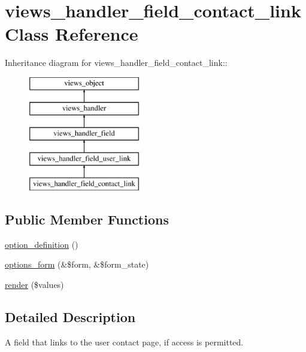 \hypertarget{classviews__handler__field__contact__link}{
\section{views\_\-handler\_\-field\_\-contact\_\-link Class Reference}
\label{classviews__handler__field__contact__link}
}
Inheritance diagram for views\_\-handler\_\-field\_\-contact\_\-link::\begin{figure}[H]
\begin{center}
\leavevmode
\includegraphics[height=5cm]{classviews__handler__field__contact__link}
\end{center}
\end{figure}
\subsection*{Public Member Functions}
\begin{CompactItemize}
\item 
\hyperlink{classviews__handler__field__contact__link_33c1b1091d417e0e5a1b82bfdc81b83b}{option\_\-definition} ()
\item 
\hyperlink{classviews__handler__field__contact__link_d6709f7a6f48dc51fe3952f26598e622}{options\_\-form} (\&\$form, \&\$form\_\-state)
\item 
\hyperlink{classviews__handler__field__contact__link_08fa45e6542168dfe0dcdd9f59f7ad45}{render} (\$values)
\end{CompactItemize}


\subsection{Detailed Description}
A field that links to the user contact page, if access is permitted. 

